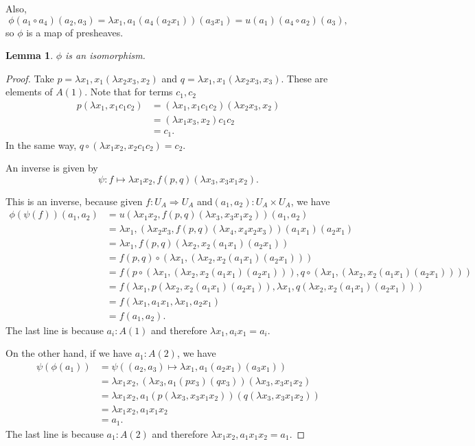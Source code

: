 \documentclass{amsbook}
\newtheorem{lemma}{Lemma}
\theoremstyle{definition}
\begin{document}
  Also,
  \[ \phi(a_1 \circ a_4) (a_2, a_3) = \lambda x_1, a_1 (a_4 (a_2 x_1)) (a_3 x_1) = u(a_1) (a_4 \circ a_2) (a_3), \]
  so $ \phi $ is a map of presheaves.
  \begin{lemma}
    $ \phi $ is an isomorphism.
  \end{lemma}
  \begin{proof}
    Take $ p = \lambda x_1, x_1 (\lambda x_2 x_3, x_2) $ and $ q = \lambda x_1, x_1 (\lambda x_2 x_3, x_3) $. These are elements of $ A(1) $. Note that for terms $ c_1, c_2 $
    \begin{align*}
      p (\lambda x_1, x_1 c_1 c_2)
      &= (\lambda x_1, x_1 c_1 c_2) (\lambda x_2 x_3, x_2)\\
      &= (\lambda x_1 x_3, x_2) c_1 c_2\\
      &= c_1.
    \end{align*}
    In the same way, $ q \circ (\lambda x_1 x_2, x_2 c_1 c_2) = c_2 $.

    An inverse is given by
    \[ \psi: f \mapsto \lambda x_1 x_2, f(p, q)(\lambda x_3, x_3 x_1 x_2). \]

    This is an inverse, because given $ f: U_A \Rightarrow U_A $ and$ (a_1, a_2): U_A \times U_A $, we have
    \begin{align*}
      \phi(\psi(f))(a_1, a_2) &= u(\lambda x_1 x_2, f(p, q)(\lambda x_3, x_3 x_1 x_2))(a_1, a_2)\\
      &= \lambda x_1, (\lambda x_2 x_3, f(p, q)(\lambda x_4, x_4 x_2 x_3)) (a_1 x_1) (a_2 x_1)\\
      &= \lambda x_1, f(p, q)(\lambda x_2, x_2 (a_1 x_1) (a_2 x_1))\\
      &= f(p, q) \circ (\lambda x_1, (\lambda x_2, x_2 (a_1 x_1) (a_2 x_1)))\\
      &= f(p \circ (\lambda x_1, (\lambda x_2, x_2 (a_1 x_1) (a_2 x_1))), q \circ (\lambda x_1, (\lambda x_2, x_2 (a_1 x_1) (a_2 x_1))))\\
      &= f(\lambda x_1, p (\lambda x_2, x_2 (a_1 x_1) (a_2 x_1)), \lambda x_1, q (\lambda x_2, x_2 (a_1 x_1) (a_2 x_1)))\\
      &= f(\lambda x_1, a_1 x_1, \lambda x_1, a_2 x_1)\\
      &= f(a_1, a_2).
    \end{align*}
    The last line is because $ a_i : A(1) $ and therefore $ \lambda x_1, a_i x_1 = a_i $.

    On the other hand, if we have $ a_1: A(2) $, we have
    \begin{align*}
      \psi(\phi(a_1)) &= \psi((a_2, a_3) \mapsto \lambda x_1, a_1 (a_2 x_1) (a_3 x_1))\\
      &= \lambda x_1 x_2, (\lambda x_3, a_1 (p x_3) (q x_3)) (\lambda x_3, x_3 x_1 x_2)\\
      &= \lambda x_1 x_2, a_1 (p (\lambda x_3, x_3 x_1 x_2)) (q (\lambda x_3, x_3 x_1 x_2))\\
      &= \lambda x_1 x_2, a_1 x_1 x_2\\
      &= a_1.
    \end{align*}
    The last line is because $ a_1 : A(2) $ and therefore $ \lambda x_1 x_2, a_1 x_1 x_2 = a_1 $.


\end{proof}
\end{document}
